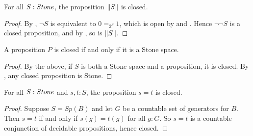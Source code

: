 \begin{corollary}\label{TruncationStoneClosed}
  For all $S:\Stone$, the proposition $\lVert S \rVert$ is closed. 
\end{corollary}
\begin{proof}
  By , $\neg S$ is equivalent to $0=_{2^S} 1$, which is open by  and . 
  Hence $\neg \neg S$ is a closed proposition, and by , so is $\lVert S \rVert$. 
\end{proof}


\begin{corollary}\label{PropositionsClosedIffStone}
  A proposition $P$ is closed if and only if it is a Stone space. 
\end{corollary}
\begin{proof}
  By the above, if $S$ is both a Stone space and a proposition, it is closed. 
  By , any closed proposition is Stone. 
\end{proof}

\begin{lemma}\label{StoneEqualityClosed}
For all $S:\Stone$ and $s,t:S$, the proposition $s=t$ is closed. 
\end{lemma}
\begin{proof}
  Suppose $S= Sp(B)$ and let $G$ be a countable set of generators for $B$. 
  Then $s=t$ if and only if $s(g) = t(g)$ for all $g:G$. 
  So $s=t$ is a countable conjunction of decidable propositions, hence 
  closed.
\end{proof}
